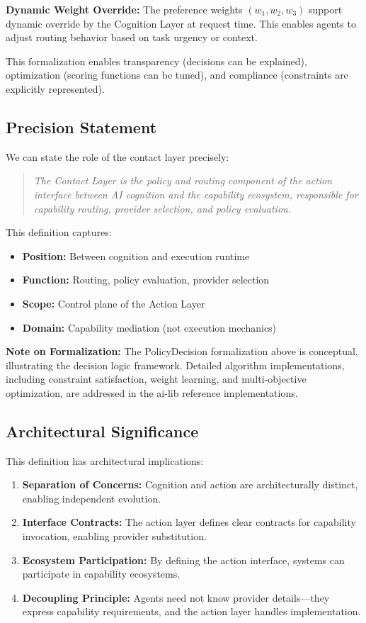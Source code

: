 \textbf{Dynamic Weight Override:} The preference weights $(w_1, w_2, w_3)$ support dynamic override by the Cognition Layer at request time. This enables agents to adjust routing behavior based on task urgency or context.

This formalization enables transparency (decisions can be explained), optimization (scoring functions can be tuned), and compliance (constraints are explicitly represented).

\subsection{Precision Statement}

We can state the role of the contact layer precisely:

\begin{quote}
\textit{The Contact Layer is the policy and routing component of the action interface between AI cognition and the capability ecosystem, responsible for capability routing, provider selection, and policy evaluation.}
\end{quote}

This definition captures:
\begin{itemize}[leftmargin=*]
\item \textbf{Position:} Between cognition and execution runtime
\item \textbf{Function:} Routing, policy evaluation, provider selection
\item \textbf{Scope:} Control plane of the Action Layer
\item \textbf{Domain:} Capability mediation (not execution mechanics)
\end{itemize}

\textbf{Note on Formalization:} The PolicyDecision formalization above is conceptual, illustrating the decision logic framework. Detailed algorithm implementations, including constraint satisfaction, weight learning, and multi-objective optimization, are addressed in the ai-lib reference implementations.

\subsection{Architectural Significance}

This definition has architectural implications:
\begin{enumerate}[label=\arabic*.]
\item \textbf{Separation of Concerns:} Cognition and action are architecturally distinct, enabling independent evolution.
\item \textbf{Interface Contracts:} The action layer defines clear contracts for capability invocation, enabling provider substitution.
\item \textbf{Ecosystem Participation:} By defining the action interface, systems can participate in capability ecosystems.
\item \textbf{Decoupling Principle:} Agents need not know provider details---they express capability requirements, and the action layer handles implementation.
\end{enumerate}
